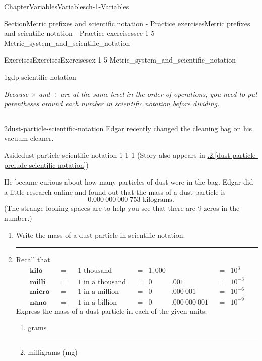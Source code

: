 \documentclass[twoside,11pt,]{book}
\newcommand{\xreffont}{\relax}
\newlength{\workspacestrutwidth}
\numberwithin{equation}{section}
\newcommand{\amp}{&}
\begin{document}
\begin{chapterptx}{Chapter}{Variables}{}{Variables}{}{}{ch-1-Variables}
\begin{sectionptx}{Section}{Metric prefixes and scientific notation - Practice exercises}{}{Metric prefixes and scientific notation - Practice exercises}{}{}{sec-1-5-Metric_system_and_scientific_notation}
\begin{exercises-subsection-numberless}{Exercises}{Exercises}{}{Exercises}{}{}{ex-1-5-Metric_system_and_scientific_notation}
\begin{divisionexercise}{1}{}{}{gdp-scientific-notation}
\begin{enumerate}[label=(\alph*),ref=\alph*]
\emph{Because \(\times\) and \(\div\) are at the same level in the order of operations, you need to put parentheses around each number in scientific notation before dividing.}%
\par\rule{\workspacestrutwidth}{1.5cm}%
\end{enumerate}%
\end{divisionexercise}%
\clearpage
\begin{divisionexercise}{2}{}{}{dust-particle-scientific-notation}%
Edgar recently changed the cleaning bag on his vacuum cleaner. \begin{aside}{Aside}{}{dust-particle-scientific-notation-1-1-1}%
(Story also appears in \hyperref[dust-particle-prelude-scientific-notation]{{\xreffont 0.8.2}.{\xreffont\ref{dust-particle-prelude-scientific-notation}}})%
\end{aside}
 He became curious about how many particles of dust were in the bag. Edgar did a little research online and found out that the mass of a dust particle is%
\begin{equation*}
0.000~000~000~753\text{ kilograms.}
\end{equation*}
(The strange-looking spaces are to help you see that there are 9 zeros in the number.)%
\begin{enumerate}[label=(\alph*),ref=\alph*]%
\item{}Write the mass of a dust particle in scientific notation.%
\par\rule{\workspacestrutwidth}{1cm}%
\item{}Recall that%
\begin{align*}
\amp\textbf{kilo} \amp
\amp= \amp 
\amp 1 \text{ thousand} \amp
\amp =\amp
1{,}000\amp\amp
\amp=\amp
10^3\amp\\
\amp\textbf{milli} \amp
\amp= \amp 
\amp 1 \text{ in a thousand} \amp
\amp =\amp
0\amp.001\amp
\amp=\amp
10^{-3}\amp\\
\amp\textbf{micro} \amp
\amp= \amp 
\amp 1 \text{ in a million} \amp
\amp =\amp
0\amp.000~001\amp
\amp=\amp
10^{-6}\amp\\
\amp\textbf{nano} \amp
\amp= \amp 
\amp 1 \text{ in a billion} \amp
\amp =\amp
0\amp.000~000~001\amp
\amp=\amp
10^{-9}\amp
\end{align*}
Express the mass of a dust particle in each of the given units:%
\begin{enumerate}[label=\roman*.,ref=\theenumi.\roman*]%
\item{}grams%
\par\rule{\workspacestrutwidth}{1cm}%
\item{}milligrams (mg)%

\end{enumerate}
\end{enumerate}
\end{divisionexercise}
\end{exercises-subsection-numberless}
\end{sectionptx}
\end{chapterptx}
\end{document}
